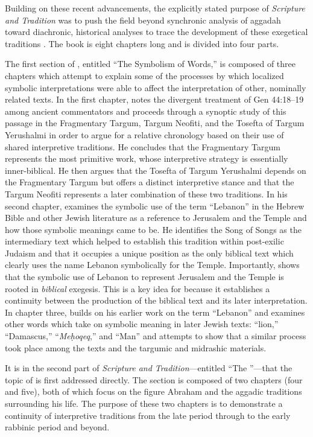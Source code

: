 Building on these recent advancements, the explicitly stated purpose of \emph{Scripture and Tradition} was to push the field beyond synchronic analysis of aggadah toward diachronic, historical analyses to trace the development of these exegetical traditions \autocites[1]{vermes1961}[See also][]{bloch1955_repr}. The book is eight chapters long and is divided into four parts. 

The first section of , entitled ``The Symbolism of Words,'' is composed of three chapters which attempt to explain some of the processes by which localized symbolic interpretations were able to affect the interpretation of other, nominally related texts.
%
In the first chapter, \vermes notes the divergent treatment of Gen 44:18--19 among ancient commentators and proceeds through a synoptic study of this passage in the Fragmentary Targum, Targum Neofiti, and the Tosefta of Targum Yerushalmi in order to argue for a relative chronology based on their use of shared interpretive traditions. He concludes that the Fragmentary Targum represents the most primitive work, whose interpretive strategy is essentially inner-biblical. He then argues that the Tosefta of Targum Yerushalmi depends on the Fragmentary Targum but offers a distinct interpretive stance and that the Targum Neofiti represents a later combination of these two traditions.
%
In his second chapter, \vermes examines the symbolic use of the term ``Lebanon'' in the Hebrew Bible and other Jewish literature as a reference to Jerusalem and the Temple and how those symbolic meanings came to be. He identifies the Song of Songs as the intermediary text which helped to establish this tradition within post-exilic Judaism and that it occupies a unique position as the only biblical text which clearly uses the name Lebanon symbolically for the Temple. Importantly, \vermes shows that the symbolic use of Lebanon to represent Jerusalem and the Temple is rooted in \emph{biblical} exegesis. This is a key idea for \vermes because it establishes a continuity between the production of the biblical text and its later interpretation.
%
In chapter three, \vermes builds on his earlier work on the term ``Lebanon'' and examines other words which take on symbolic meaning in later Jewish texts: ``lion,'' ``Damascus,'' ``\emph{Meḥoqeq},'' and ``Man'' and attempts to show that a similar process took place among the \dss texts and the targumic and midrashic materials. 

It is in the second part of \emph{Scripture and Tradition}---entitled ``The \RwB''---that the topic of \RwB is first addressed directly. The section is composed of two chapters (four and five), both of which focus on the figure Abraham and the aggadic traditions surrounding his life. The purpose of these two chapters is to demonstrate a continuity of interpretive traditions from the late \secondtemple period through to the early rabbinic period and beyond. 


